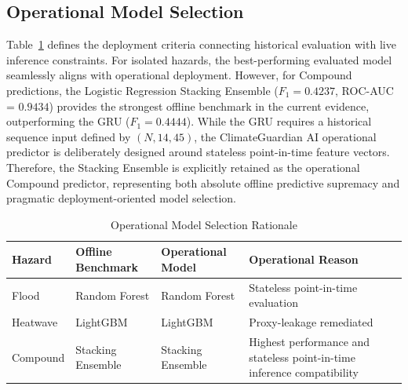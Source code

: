 \subsection{Operational Model Selection}
Table~\ref{tab:op_selection} defines the deployment criteria connecting historical evaluation with live inference constraints. For isolated hazards, the best-performing evaluated model seamlessly aligns with operational deployment. However, for Compound predictions, the Logistic Regression Stacking Ensemble ($F_1 = 0.4237$, ROC-AUC = $0.9434$) provides the strongest offline benchmark in the current evidence, outperforming the GRU ($F_1 = 0.4444$). While the GRU requires a historical sequence input defined by $(N, 14, 45)$, the ClimateGuardian AI operational predictor is deliberately designed around stateless point-in-time feature vectors. Therefore, the Stacking Ensemble is explicitly retained as the operational Compound predictor, representing both absolute offline predictive supremacy and pragmatic deployment-oriented model selection.

\begin{table}[htbp]
\caption{Operational Model Selection Rationale}
\begin{center}
\begin{tabular}{p{1.3cm} p{2.2cm} p{1.6cm} p{2.4cm}}
\toprule
\textbf{Hazard} & \textbf{Offline Benchmark} & \textbf{Operational Model} & \textbf{Operational Reason} \\
\midrule
Flood & Random Forest & Random Forest & Stateless point-in-time evaluation \\
Heatwave & LightGBM & LightGBM & Proxy-leakage remediated \\
Compound & Stacking Ensemble & Stacking Ensemble & Highest performance and stateless point-in-time inference compatibility \\
\bottomrule
\end{tabular}
\label{tab:op_selection}
\end{center}
\end{table}
